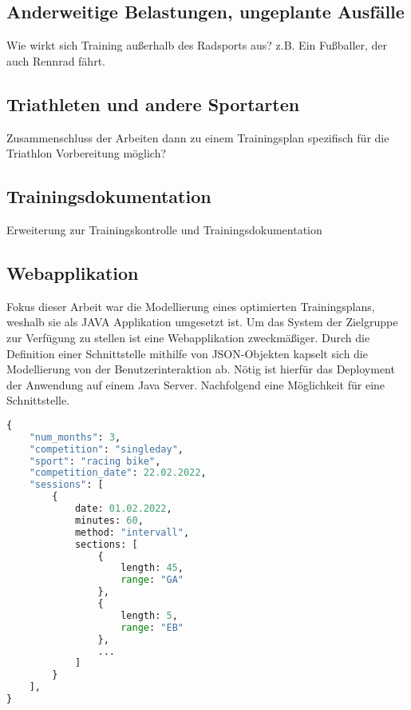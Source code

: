 \subsection{Anderweitige Belastungen, ungeplante Ausfälle}
Wie wirkt sich Training außerhalb des Radsports aus? z.B. Ein Fußballer, der auch Rennrad fährt.

\subsection{Triathleten und andere Sportarten}
Zusammenschluss der Arbeiten dann zu einem Trainingsplan spezifisch für die Triathlon Vorbereitung möglich?

\subsection{Trainingsdokumentation}
Erweiterung zur Trainingskontrolle und Trainingsdokumentation

\subsection{Webapplikation}
Fokus dieser Arbeit war die Modellierung eines optimierten Trainingsplans, weshalb sie als JAVA Applikation umgesetzt ist. Um das System der Zielgruppe zur Verfügung zu stellen ist eine Webapplikation zweckmäßiger. Durch die Definition einer Schnittstelle mithilfe von JSON-Objekten kapselt sich die Modellierung von der Benutzerinteraktion ab. Nötig ist hierfür das Deployment der Anwendung auf einem Java Server. Nachfolgend eine Möglichkeit für eine Schnittstelle.
\begin{lstlisting}[language=python]
{ 
    "num_months": 3,
    "competition": "singleday",
    "sport": "racing bike",
    "competition_date": 22.02.2022,
    "sessions": [
        {
            date: 01.02.2022,
            minutes: 60,
            method: "intervall",
            sections: [
                {
                    length: 45,
                    range: "GA"
                },
                {
                    length: 5,
                    range: "EB"
                },
                ...
            ]
        }
    ], 
}
\end{lstlisting}

